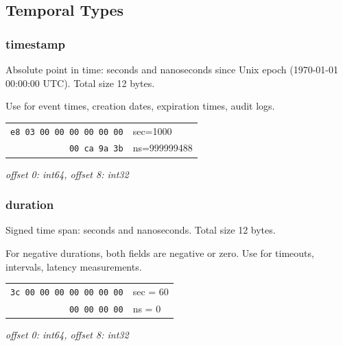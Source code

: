 \documentclass[11pt,onecolumn]{article}
\begin{document}
\subsection{Temporal Types}

\begin{minipage}{\textwidth}
\subsubsection{timestamp}

\begin{minipage}[t]{0.50\textwidth}
\raggedright
Absolute point in time: seconds and nanoseconds since Unix epoch (1970-01-01 00:00:00 UTC). Total size 12 bytes.

Use for event times, creation dates, expiration times, audit logs.
\end{minipage}\hfill
\begin{minipage}[t]{0.46\textwidth}
\small
\begin{tabular}[t]{@{}r@{\,}l@{}}
\texttt{e8 03 00 00 00 00 00 00} & sec=1000 \\
\texttt{00 ca 9a 3b} & ns=999999488 \\
\end{tabular}

\vspace{4pt}
\textit{offset 0: int64, offset 8: int32}
\end{minipage}

\vspace{10pt}
\subsubsection{duration}

\begin{minipage}[t]{0.52\textwidth}
Signed time span: seconds and nanoseconds. Total size 12 bytes.

For negative durations, both fields are negative or zero. Use for timeouts, intervals, latency measurements.
\end{minipage}\hfill
\begin{minipage}[t]{0.44\textwidth}
\small
\begin{tabular}[t]{@{}r@{ }l@{}}
\texttt{3c 00 00 00 00 00 00 00} & sec = 60 \\
\texttt{00 00 00 00} & ns = 0 \\
\end{tabular}

\vspace{4pt}
\textit{offset 0: int64, offset 8: int32}
\end{minipage}
\end{minipage}
\end{document}
